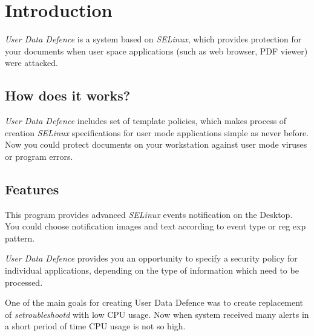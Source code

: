 \chapter{Introduction}

\emph{User Data Defence} is a system based on \emph{SELinux}, which provides protection for your documents when user space applications (such as web browser, PDF viewer) were attacked.


\section{How does it works?}
\emph{User Data Defence} includes set of template policies, which makes
process of creation \emph{SELinux} specifications for user mode
applications simple as never before. Now you could protect documents on
your workstation against user mode viruses or program errors.

\section{Features}
This program provides advanced \emph{SELinux} events
notification on the Desktop. You could choose notification images and
text according to event type or reg exp pattern.


\emph{User Data Defence} provides you an opportunity to specify a
security policy for individual applications, depending on the type of
information which need to be processed.


One of the main goals for creating User Data Defence was to create
replacement of \emph{setroubleshootd} with low CPU usage. Now when
system received many alerts in a short period of time CPU usage is not
so high.

